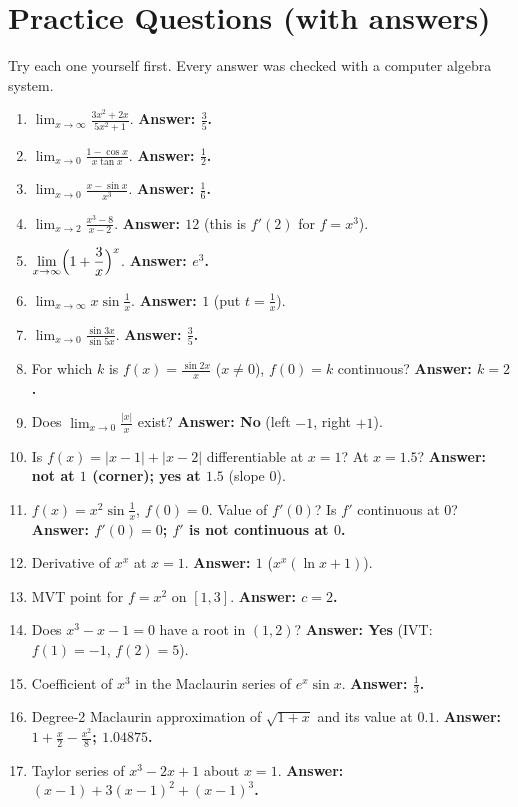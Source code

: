 \documentclass[11pt,a4paper]{article}
\begin{document}
\section{Practice Questions (with answers)}
Try each one yourself first. Every answer was checked with a computer algebra system.
\begin{enumerate}[leftmargin=*,itemsep=4pt]
\item $\displaystyle\lim_{x\to\infty}\frac{3x^2+2x}{5x^2+1}$. \textbf{Answer: $\frac35$.}
\item $\displaystyle\lim_{x\to0}\frac{1-\cos x}{x\tan x}$. \textbf{Answer: $\frac12$.}
\item $\displaystyle\lim_{x\to0}\frac{x-\sin x}{x^3}$. \textbf{Answer: $\frac16$.}
\item $\displaystyle\lim_{x\to2}\frac{x^3-8}{x-2}$. \textbf{Answer: $12$} (this is $f'(2)$ for $f=x^3$).
\item $\displaystyle\lim_{x\to\infty}\Bigl(1+\frac3x\Bigr)^x$. \textbf{Answer: $e^3$.}
\item $\displaystyle\lim_{x\to\infty}x\sin\frac1x$. \textbf{Answer: $1$} (put $t=\frac1x$).
\item $\displaystyle\lim_{x\to0}\frac{\sin3x}{\sin5x}$. \textbf{Answer: $\frac35$.}
\item For which $k$ is $f(x)=\frac{\sin2x}{x}$ ($x\ne0$), $f(0)=k$ continuous? \textbf{Answer: $k=2$.}
\item Does $\displaystyle\lim_{x\to0}\frac{|x|}{x}$ exist? \textbf{Answer: No} (left $-1$, right $+1$).
\item Is $f(x)=|x-1|+|x-2|$ differentiable at $x=1$? At $x=1.5$? \textbf{Answer: not at $1$ (corner); yes at $1.5$} (slope $0$).
\item $f(x)=x^2\sin\frac1x$, $f(0)=0$. Value of $f'(0)$? Is $f'$ continuous at $0$? \textbf{Answer: $f'(0)=0$; $f'$ is not continuous at $0$.}
\item Derivative of $x^x$ at $x=1$. \textbf{Answer: $1$} ($x^x(\ln x+1)$).
\item MVT point for $f=x^2$ on $[1,3]$. \textbf{Answer: $c=2$.}
\item Does $x^3-x-1=0$ have a root in $(1,2)$? \textbf{Answer: Yes} (IVT: $f(1)=-1$, $f(2)=5$).
\item Coefficient of $x^3$ in the Maclaurin series of $e^x\sin x$. \textbf{Answer: $\frac13$.}
\item Degree-2 Maclaurin approximation of $\sqrt{1+x}$ and its value at $0.1$. \textbf{Answer: $1+\frac x2-\frac{x^2}8$; $1.04875$.}
\item Taylor series of $x^3-2x+1$ about $x=1$. \textbf{Answer: $(x-1)+3(x-1)^2+(x-1)^3$.}

\end{enumerate}
\end{document}
